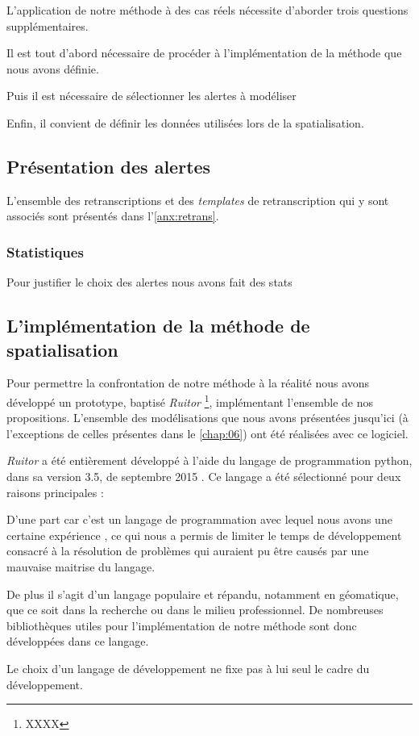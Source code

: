 L’application de notre méthode à des cas réels nécessite d'aborder
trois questions supplémentaires.

Il est tout d'abord nécessaire de procéder à l'implémentation de la
méthode que nous avons définie.

Puis il est nécessaire de sélectionner les alertes à modéliser

Enfin, il convient de définir les données utilisées lors de la
spatialisation.

\subsection{Présentation des alertes}



L'ensemble des retranscriptions et des \emph{templates} de
retranscription qui y sont associés sont présentés dans
l'\autoref{anx:retrans}.


\subsubsection{Statistiques}

Pour justifier le choix des alertes nous avons fait des stats 


\subsection{L'implémentation de la méthode de spatialisation}

Pour permettre la confrontation de notre méthode à la réalité nous
avons développé un prototype, baptisé \emph{Ruitor} \footnote{XXXX},
implémentant l'ensemble de nos propositions.
%
L'ensemble des modélisations que nous avons présentées jusqu'ici (à
l'exceptions de celles présentes dans le \autoref{chap:06}) ont été
réalisées avec ce logiciel.

\emph{Ruitor} a été entièrement développé à l'aide du langage de
programmation python, dans sa version 3.5, de septembre 2015
\autocite{VanRossum2009}. Ce langage a été sélectionné pour deux
raisons principales :
%
\begin{enumerate*}[label=(\arabic*)]
\item D'une part car c'est un langage de programmation avec lequel
  nous avons une certaine expérience \autocite{Bunel2017b,Bunel2017c},
  ce qui nous a permis de limiter le temps de développement consacré à
  la résolution de problèmes qui auraient pu être causés par une
  mauvaise maitrise du langage.
\item De plus il s'agit d'un langage populaire et répandu, notamment
  en géomatique, que ce soit dans la recherche ou dans le milieu
  professionnel. De nombreuses bibliothèques utiles pour
  l'implémentation de notre méthode sont donc développées dans ce
  langage.
\end{enumerate*}
%
Le choix d'un langage de développement ne fixe pas à lui seul le cadre
du développement.

